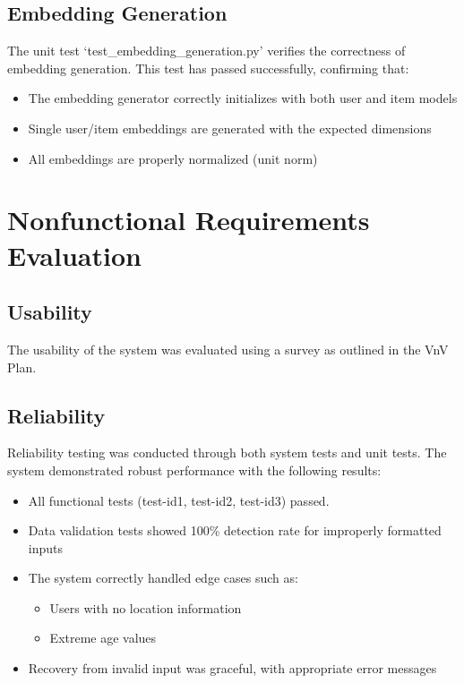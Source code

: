 \documentclass[12pt, titlepage]{article}
\begin{document}
\subsection{Embedding Generation}

The unit test `test\_embedding\_generation.py' verifies the correctness of embedding generation. This test has passed successfully, confirming that:
\begin{itemize}
    \item The embedding generator correctly initializes with both user and item models
    \item Single user/item embeddings are generated with the expected dimensions
    \item All embeddings are properly normalized (unit norm)
\end{itemize}

\section{Nonfunctional Requirements Evaluation}

\subsection{Usability}

The usability of the system was evaluated using a survey as outlined in the VnV Plan. 

\subsection{Reliability}

Reliability testing was conducted through both system tests and unit tests. The system demonstrated robust performance with the following results:

\begin{itemize}
    \item All functional tests (test-id1, test-id2, test-id3) passed.
    \item Data validation tests showed 100\% detection rate for improperly formatted inputs
    \item The system correctly handled edge cases such as:
        \begin{itemize}
            \item Users with no location information
            \item Extreme age values
        \end{itemize}
    \item Recovery from invalid input was graceful, with appropriate error messages
\end{itemize}
\end{document}
